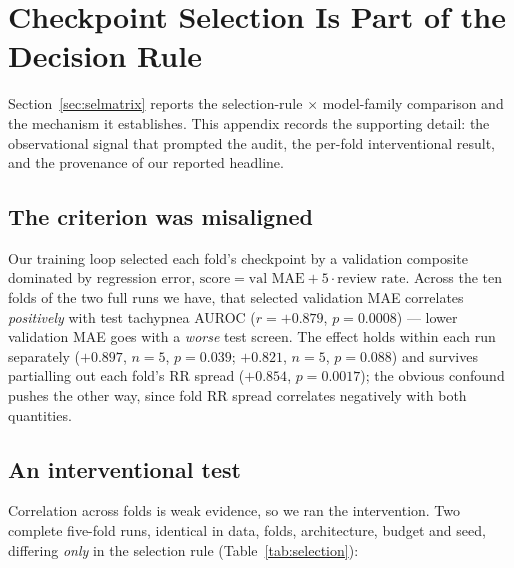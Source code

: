 
\section{Checkpoint Selection Is Part of the Decision Rule}
\label{app:selection}

Section~\ref{sec:selmatrix} reports the selection-rule $\times$ model-family comparison and the
mechanism it establishes. This appendix records the supporting detail: the observational signal that
prompted the audit, the per-fold interventional result, and the provenance of our reported headline.

\subsection{The criterion was misaligned}
Our training loop selected each fold's checkpoint by a validation composite dominated by regression
error, $\text{score} = \text{val MAE} + 5\cdot\text{review rate}$. Across the ten folds of the two full
runs we have, that selected validation MAE correlates \emph{positively} with test tachypnea AUROC
($r={+}0.879$, $p=0.0008$) --- lower validation MAE goes with a \emph{worse} test screen. The effect holds
within each run separately (${+}0.897$, $n{=}5$, $p=0.039$; ${+}0.821$, $n{=}5$, $p=0.088$) and survives
partialling out each fold's RR spread (${+}0.854$, $p=0.0017$); the obvious confound pushes the other way,
since fold RR spread correlates negatively with both quantities.

\subsection{An interventional test}
Correlation across folds is weak evidence, so we ran the intervention. Two complete five-fold runs,
identical in data, folds, architecture, budget and seed, differing \emph{only} in the selection rule
(Table~\ref{tab:selection}):

